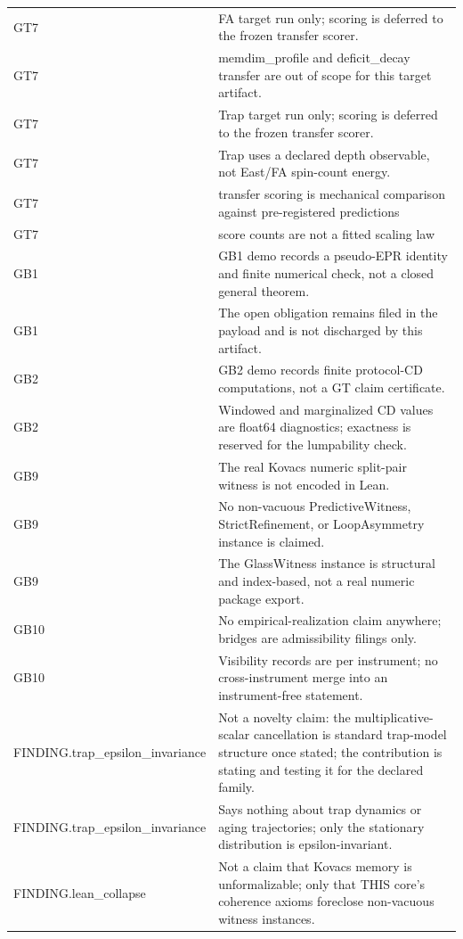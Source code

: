 \documentclass[11pt]{article}
\theoremstyle{definition}
\begin{document}
\begin{longtable}{lp{9cm}}
GT7 & FA target run only; scoring is deferred to the frozen transfer scorer. \\
GT7 & memdim\_profile and deficit\_decay transfer are out of scope for this target artifact. \\
GT7 & Trap target run only; scoring is deferred to the frozen transfer scorer. \\
GT7 & Trap uses a declared depth observable, not East/FA spin-count energy. \\
GT7 & transfer scoring is mechanical comparison against pre-registered predictions \\
GT7 & score counts are not a fitted scaling law \\
GB1 & GB1 demo records a pseudo-EPR identity and finite numerical check, not a closed general theorem. \\
GB1 & The open obligation remains filed in the payload and is not discharged by this artifact. \\
GB2 & GB2 demo records finite protocol-CD computations, not a GT claim certificate. \\
GB2 & Windowed and marginalized CD values are float64 diagnostics; exactness is reserved for the lumpability check. \\
GB9 & The real Kovacs numeric split-pair witness is not encoded in Lean. \\
GB9 & No non-vacuous PredictiveWitness, StrictRefinement, or LoopAsymmetry instance is claimed. \\
GB9 & The GlassWitness instance is structural and index-based, not a real numeric package export. \\
GB10 & No empirical-realization claim anywhere; bridges are admissibility filings only. \\
GB10 & Visibility records are per instrument; no cross-instrument merge into an instrument-free statement. \\
FINDING.trap\_epsilon\_invariance & Not a novelty claim: the multiplicative-scalar cancellation is standard trap-model structure once stated; the contribution is stating and testing it for the declared family. \\
FINDING.trap\_epsilon\_invariance & Says nothing about trap dynamics or aging trajectories; only the stationary distribution is epsilon-invariant. \\
FINDING.lean\_collapse & Not a claim that Kovacs memory is unformalizable; only that THIS core's coherence axioms foreclose non-vacuous witness instances. \\

\end{longtable}
\end{document}
